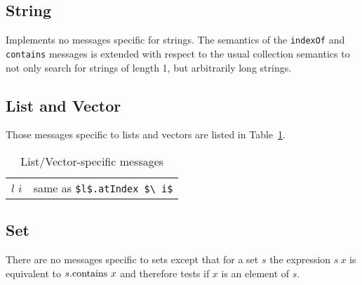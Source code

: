\documentclass[11pt]{amsart}
\newcommand{\tabparbox}[1] {\parbox{12cm}{

\vspace{0.1cm}
#1
\vspace{0.1cm}
}}
\newcommand{\babelsrc}[1] {\lstinline!#1!}
\begin{document}
\subsection{String} Implements no messages specific for strings. The semantics of the \babelsrc{indexOf} and \babelsrc{contains} messages is extended with respect to the usual collection semantics to not only search for strings of length 1, but arbitrarily long strings.

\subsection{List and Vector} Those messages specific to lists and vectors are listed in Table~\ref{tab:listvectorops}.  
\begin{table}
\caption{List/Vector-specific messages}
\begin{tabular}{c|c}
$l$ $i$ & \tabparbox{same as \babelsrc{$l$.atIndex $\ i$}}\\\hline
$-l$ & \tabparbox{reverses $l$}
\end{tabular}
\label{tab:listvectorops}
\end{table}

\subsection{Set}
There are no messages specific to sets except that for a set $s$ the expression $s\ x$ is equivalent to 
$s.\babelsrc{contains}\ x$ and therefore tests if $x$ is an element of $s$. 
\end{document}
